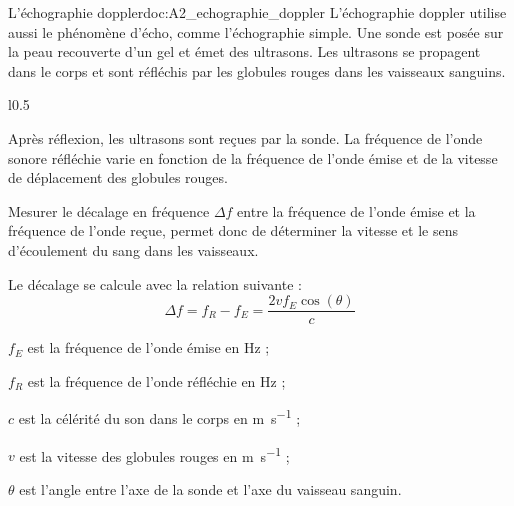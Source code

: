 \begin{doc}{L'échographie doppler}{doc:A2_echographie_doppler}
  L'échographie doppler utilise aussi le phénomène d'écho, comme l'échographie simple.
  Une sonde est posée sur la peau recouverte d'un gel et émet des ultrasons.
  Les ultrasons se propagent dans le corps et sont réfléchis par les globules rouges dans les vaisseaux sanguins.

  \begin{wrapfigure}[10]{l}{0.5\linewidth}
    \centering
    \vspace*{-10pt}
  \end{wrapfigure}

  Après réflexion, les ultrasons sont reçues par la sonde.
  La fréquence de l'onde sonore réfléchie varie en fonction de la fréquence de l'onde émise et de la vitesse de déplacement des globules rouges.

  Mesurer le décalage en fréquence $\Delta f$ entre la fréquence de l'onde émise et la fréquence de l'onde reçue, permet donc de déterminer la vitesse et le sens d'écoulement du sang dans les vaisseaux.
  \vspace*{13pt}

  \begin{importants}
    Le décalage se calcule avec la relation suivante :
    \begin{equation*}
      \Delta f = f_R - f_E = \dfrac{2vf_E \cos(\theta)}{c}
    \end{equation*}
  \end{importants}
  
  \begin{listePoints}[2]
    \item $f_E$ est la fréquence de l'onde émise en \unit{\hertz} ;
    \item $f_R$ est la fréquence de l'onde réfléchie en \unit{\hertz} ;
    \item $c$ est la célérité du son dans le corps en \unit{\m\per\s} ;
    \item $v$ est la vitesse des globules rouges en \unit{\m\per\s} ;
    \item $\theta$ est l'angle entre l'axe de la sonde et l'axe du vaisseau sanguin.
  \end{listePoints}
\end{doc}




